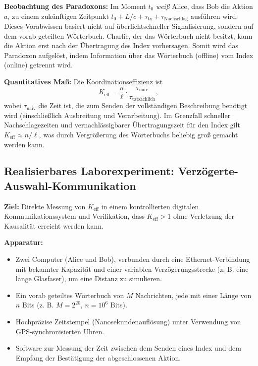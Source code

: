 \documentclass[12pt]{article}
\begin{document}
	\textbf{Beobachtung des Paradoxons:}
	Im Moment \(t_0\) \emph{weiß} Alice, dass Bob die Aktion \(a_i\) zu einem zukünftigen Zeitpunkt \(t_0 + L/c + \tau_{\text{tx}} + \tau_{\text{Nachschlag}}\) ausführen wird. Dieses Vorabwissen basiert nicht auf überlichtschneller Signalisierung, sondern auf dem vorab geteilten Wörterbuch. Charlie, der das Wörterbuch nicht besitzt, kann die Aktion erst nach der Übertragung des Index vorhersagen. Somit wird das Paradoxon aufgelöst, indem Information über das Wörterbuch (offline) vom Index (online) getrennt wird.
	
	\textbf{Quantitatives Maß:}
	Die Koordinationseffizienz ist
	\[
	K_{\mathrm{eff}} = \frac{n}{\ell} \cdot \frac{\tau_{\text{naiv}}}{\tau_{\text{tatsächlich}}},
	\]
	wobei \(\tau_{\text{naiv}}\) die Zeit ist, die zum Senden der vollständigen Beschreibung benötigt wird (einschließlich Ausbreitung und Verarbeitung). Im Grenzfall schneller Nachschlagezeiten und vernachlässigbarer Übertragungszeit für den Index gilt \(K_{\mathrm{eff}} \approx n/\ell\), was durch Vergrößerung des Wörterbuchs beliebig groß gemacht werden kann.
	
	\subsection{Realisierbares Laborexperiment: Verzögerte-Auswahl-Kommunikation}
	\label{subsec:lab-delayed-choice}
	
	\textbf{Ziel:} Direkte Messung von \(K_{\mathrm{eff}}\) in einem kontrollierten digitalen Kommunikationssystem und Verifikation, dass \(K_{\mathrm{eff}} > 1\) ohne Verletzung der Kausalität erreicht werden kann.
	
	\textbf{Apparatur:}
	\begin{itemize}
		\item Zwei Computer (Alice und Bob), verbunden durch eine Ethernet-Verbindung mit bekannter Kapazität und einer variablen Verzögerungsstrecke (z. B. eine lange Glasfaser), um eine Distanz zu simulieren.
		\item Ein vorab geteiltes Wörterbuch von \(M\) Nachrichten, jede mit einer Länge von \(n\) Bits (z. B. \(M = 2^{20}\), \(n = 10^6\) Bits).
		\item Hochpräzise Zeitstempel (Nanosekundenauflösung) unter Verwendung von GPS-synchronisierten Uhren.
		\item Software zur Messung der Zeit zwischen dem Senden eines Index und dem Empfang der Bestätigung der abgeschlossenen Aktion.
	\end{itemize}
	
\end{document}
